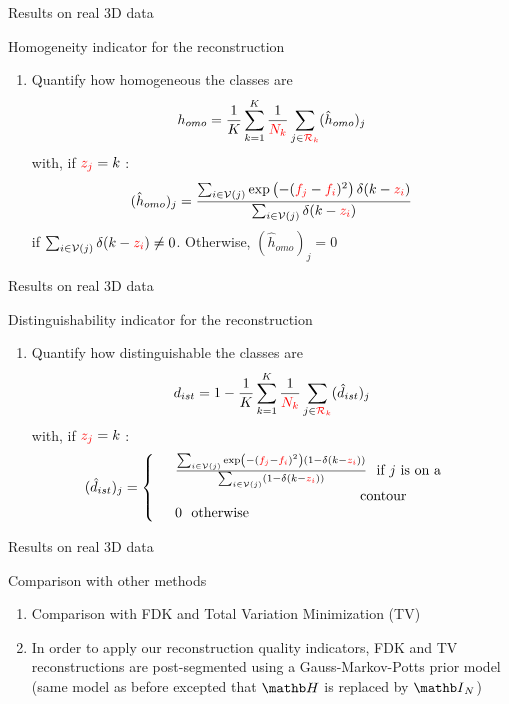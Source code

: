 \documentclass[latex]{beamer}
\def\beq{\[} \def\eeq{\]}
\begin{document}
\begin{frame}{Results on real 3D data}
\begin{block}{Homogeneity indicator for the reconstruction}
\begin{enumerate}
\item Quantify how homogeneous the classes are
\beq
h_{omo}=\frac{1}{K}\sum_{k=1}^{K}\frac{1}{\red{N_k}}\sum_{j \in \red{\Rc_k}}(\hat{h}_{omo})_{j}
\eeq
with, if ${\color{red}z_j}=k$ :
\beq
(\hat{h}_{omo})_{j}=
\frac{\sum_{i \in \Vc(j)}\exp\left(-(\red{f_j}-\red{f_i})^{2}\right)\delta(k-\red{z_i})}{\sum_{i \in \Vc(j)}\delta(k-\red{z_i})}
\eeq
if $\sum_{i \in {\ensuremath{\mathcal{V}}}(j)}\delta(k-{\color{red}z_i}) \neq 0$. Otherwise, $(\hat{h}_{omo})_{j}=0$
\end{enumerate}
\end{block}
\end{frame}

\begin{frame}{Results on real 3D data}
\begin{block}{Distinguishability indicator for the reconstruction}
\begin{enumerate}
\item Quantify how distinguishable the classes are
\beq
d_{ist}=1-\frac{1}{K}\sum_{k=1}^{K}\frac{1}{\red{N_k}}\sum_{j \in \red{\Rc_k}}(\hat{d}_{ist})_{j}
\eeq
with, if ${\color{red}z_j}=k$ :
\beq
(\hat{d}_{ist})_{j}=
\left\{
\barr{ll}
&\frac{\sum_{i \in \Vc(j)}\exp\left(-(\red{f_j}-\red{f_i})^{2}\right)(1-\delta(k-\red{z_i}))}{\sum_{i \in \Vc(j)}(1-\delta(k-\red{z_i}))} \mbox{~~if $j$ is on a~~} \\
&\mbox{~~\hspace*{43mm} contour~~} \\
&0 \mbox{~~otherwise~~}
\earr
\right.
\eeq
\end{enumerate}
\end{block}
\end{frame}

\begin{frame}{Results on real 3D data}
\begin{block}{Comparison with other methods}
\begin{enumerate}
\item Comparison with FDK and Total Variation Minimization (TV)
\item In order to apply our reconstruction quality indicators, FDK and TV reconstructions are post-segmented using a Gauss-Markov-Potts prior model (same model as before excepted that $\Hb$ is replaced by $\Ib_N$)
\end{enumerate}
\end{block}
\end{frame}
\end{document}
